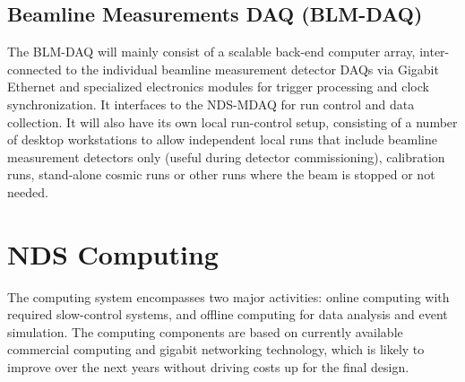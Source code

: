 \subsection{Beamline Measurements DAQ (BLM-DAQ)}

The BLM-DAQ will mainly consist of a scalable back-end 
computer array, inter-connected to the individual beamline measurement detector DAQs via 
Gigabit Ethernet and specialized electronics modules for trigger processing and clock 
synchronization. 
It interfaces to the NDS-MDAQ for run control and 
data collection. It will also have its own local run-control setup, consisting of a number 
of desktop workstations to allow independent local runs that include beamline measurement 
detectors only (useful during detector commissioning), calibration runs, stand-alone cosmic 
runs or other runs where the beam is stopped or not needed.


\section{NDS Computing}
\label{sec:nd-gdaq-global-computing}

The computing system encompasses two major activities: online computing with required 
slow-control systems, and offline computing for data analysis and event simulation.
The computing components are based 
on currently available commercial computing and gigabit networking technology, which is 
likely to improve over the next years without driving costs up for the final design.  

